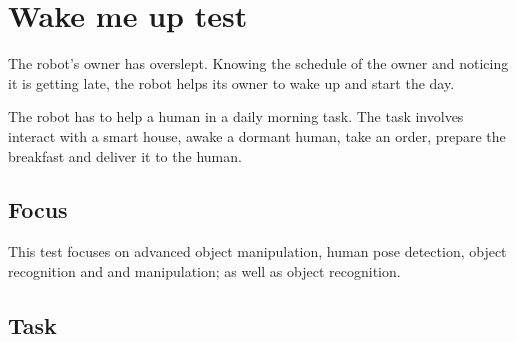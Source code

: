 \section{Wake me up test}

The robot's owner has overslept. Knowing the schedule of the owner and noticing it is getting late, the robot helps its owner to wake up and start the day.

The robot has to help a human in a daily morning task. The task involves interact with a smart house, awake a dormant human, take an order, prepare the breakfast and deliver it to the human.

\subsection{Focus}

This test focuses on advanced object manipulation, human pose detection, object recognition and and manipulation; as well as object recognition.


\subsection{Task}

